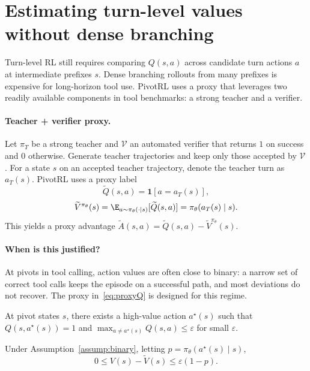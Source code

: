 \section{Estimating turn-level values without dense branching}
\label{sec:qv}

Turn-level RL still requires comparing $Q(s,a)$ across candidate turn actions $a$ at intermediate prefixes $s$.
Dense branching rollouts from many prefixes is expensive for long-horizon tool use.
PivotRL uses a proxy that leverages two readily available components in tool benchmarks: a strong teacher and a verifier.

\paragraph{Teacher + verifier proxy.}
Let $\pi_T$ be a strong teacher and $\mathcal{V}$ an automated verifier that returns $1$ on success and $0$ otherwise.
Generate teacher trajectories and keep only those accepted by $\mathcal{V}$.
For a state $s$ on an accepted teacher trajectory, denote the teacher turn as $a_T(s)$.
PivotRL uses a proxy label
\begin{equation}
\label{eq:proxyQ}
\widetilde Q(s,a) = \mathbf{1}[a=a_T(s)],
\end{equation}
\begin{equation}
\widetilde V^{\pi_\theta}(s)=\E_{a\sim\pi_\theta(\cdot\mid s)}[\widetilde Q(s,a)]=\pi_\theta(a_T(s)\mid s).
\end{equation}
This yields a proxy advantage $\widetilde A(s,a)=\widetilde Q(s,a)-\widetilde V^{\pi_\theta}(s)$.

\paragraph{When is this justified?}
At pivots in tool calling, action values are often close to binary: a narrow set of correct tool calls keeps the episode on a successful path, and most deviations do not recover.
The proxy in~\eqref{eq:proxyQ} is designed for this regime.

\begin{assumption}
\label{assump:binary}
At pivot states $s$, there exists a high-value action $a^\star(s)$ such that
$Q(s,a^\star(s))=1$ and $\max_{a\neq a^\star(s)} Q(s,a)\le \varepsilon$ for small $\varepsilon$.
\end{assumption}

\begin{proposition}
\label{prop:proxy}
Under Assumption~\ref{assump:binary}, letting $p=\pi_\theta(a^\star(s)\mid s)$,
\[
0 \le V(s)-\widetilde V(s) \le \varepsilon(1-p).
\]
\end{proposition}

